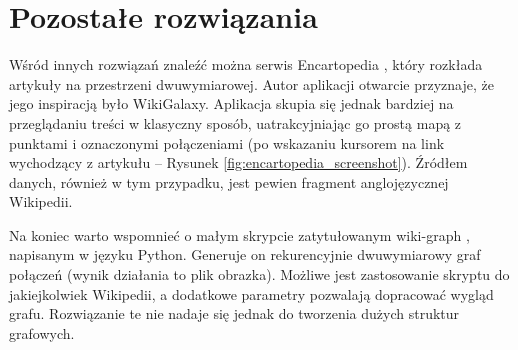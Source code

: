 \section{Pozostałe rozwiązania}

Wśród innych rozwiązań znaleźć można serwis Encartopedia \cite{Encartopedia}, który rozkłada artykuły na przestrzeni dwuwymiarowej. Autor aplikacji otwarcie przyznaje, że jego inspiracją było WikiGalaxy. Aplikacja skupia się jednak bardziej na przeglądaniu treści w klasyczny sposób, uatrakcyjniając go prostą mapą z punktami i oznaczonymi połączeniami (po wskazaniu kursorem na link wychodzący z artykułu – Rysunek \ref{fig:encartopedia_screenshot}). Źródłem danych, również w tym przypadku, jest pewien fragment anglojęzycznej Wikipedii.


Na koniec warto wspomnieć o małym skrypcie zatytułowanym wiki-graph \cite{WikiGraphPython}, napisanym w języku Python. Generuje on rekurencyjnie dwuwymiarowy graf połączeń (wynik działania to plik obrazka). Możliwe jest zastosowanie skryptu do jakiejkolwiek Wikipedii, a dodatkowe parametry pozwalają dopracować wygląd grafu. Rozwiązanie te nie nadaje się jednak do tworzenia dużych struktur grafowych.